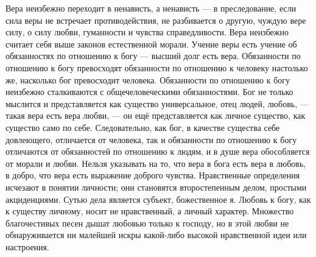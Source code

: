 \documentclass[12pt,oneside]{book}
\begin{document}
Вера неизбежно переходит в ненависть, а ненависть --- в преследование, если сила веры не встречает противодействия, не разбивается о другую, чуждую вере силу, о силу любви, гуманности и чувства справедливости. Вера неизбежно считает себя выше законов естественной морали. Учение веры есть учение об обязанностях по отношению к богу --- высший долг есть вера. Обязанности по отношению к богу превосходят обязанности по отношению к человеку настолько же, насколько бог превосходит человека. Обязанности по отношению к богу неизбежно сталкиваются с общечеловеческими обязанностями. Бог не только мыслится и представляется как существо универсальное, отец людей, любовь, --- такая вера есть вера любви, --- он ещё представляется как личное существо, как существо само по себе. Следовательно, как бог, в качестве существа себе довлеющего, отличается от человека, так и обязанности по отношению к богу отличаются от обязанностей по отношению к людям, и в душе вера обособляется от морали и любви\ddag\let\svthefootnote\thefootnote\let\thefootnote\relax{}\let\thefootnote\svthefootnote. Нельзя указывать на то, что вера в бога есть вера в любовь, в добро, что вера есть выражение доброго чувства. Нравственные определения исчезают в понятии личности; они становятся второстепенным делом, простыми акциденциями. Сутью дела является субъект, божественное я. Любовь к богу, как к существу личному, носит не нравственный, а личный характер. Множество благочестивых песен дышат любовью только к господу, но в этой любви не обнаруживается ни малейшей искры какой-либо высокой нравственной идеи или настроения.
\end{document}
